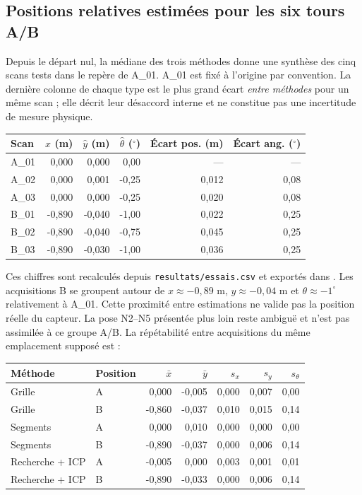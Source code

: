 \documentclass[11pt,a4paper]{article}
\begin{document}
\subsection{Positions relatives estimées pour les six tours A/B}
Depuis le départ nul, la médiane des trois méthodes donne une synthèse
des cinq scans tests dans le repère de A\_01. A\_01 est fixé à l'origine
par convention. La dernière colonne de chaque type est le plus grand
écart \emph{entre méthodes} pour un même scan ; elle décrit leur désaccord
interne et ne constitue pas une incertitude de mesure physique.
\begin{center}\footnotesize\setlength{\tabcolsep}{3pt}
\begin{tabular}{lrrrrr}\toprule
Scan & $\hat x$ (m) & $\hat y$ (m) & $\hat\theta$ ($^\circ$) &
Écart pos. (m) & Écart ang. ($^\circ$)\\\midrule
A\_01 & 0,000 & 0,000 & 0,00 & --- & --- \\
A\_02 & 0,000 & 0,001 & -0,25 & 0,012 & 0,08 \\
A\_03 & 0,000 & 0,000 & -0,25 & 0,020 & 0,08 \\
B\_01 & -0,890 & -0,040 & -1,00 & 0,022 & 0,25 \\
B\_02 & -0,890 & -0,040 & -0,75 & 0,045 & 0,25 \\
B\_03 & -0,890 & -0,030 & -1,00 & 0,036 & 0,25 \\
\bottomrule\end{tabular}
\end{center}
Ces chiffres sont recalculés depuis \texttt{resultats/essais.csv} et
exportés dans . Les acquisitions
B se groupent autour de $x\approx-0{,}89$ m, $y\approx-0{,}04$ m et
$\theta\approx-1^\circ$ relativement à A\_01. Cette proximité entre
estimations ne valide pas la position réelle du capteur. La pose N2--N5
présentée plus loin reste ambiguë et n'est pas assimilée à ce groupe A/B.
La répétabilité entre acquisitions du même emplacement supposé est :
\begin{center}\small
\begin{tabular}{llrrrrr}\toprule
Méthode & Position & $\bar x$ & $\bar y$ & $s_x$ & $s_y$ & $s_\theta$\\\midrule
Grille & A & 0,000 & -0,005 & 0,000 & 0,007 & 0,00 \\
Grille & B & -0,860 & -0,037 & 0,010 & 0,015 & 0,14 \\
Segments & A & 0,000 & 0,010 & 0,000 & 0,000 & 0,00 \\
Segments & B & -0,890 & -0,037 & 0,000 & 0,006 & 0,14 \\
Recherche + ICP & A & -0,005 & 0,000 & 0,003 & 0,001 & 0,01 \\
Recherche + ICP & B & -0,890 & -0,033 & 0,000 & 0,006 & 0,14 \\
\bottomrule\end{tabular}
\end{center}
\end{document}
